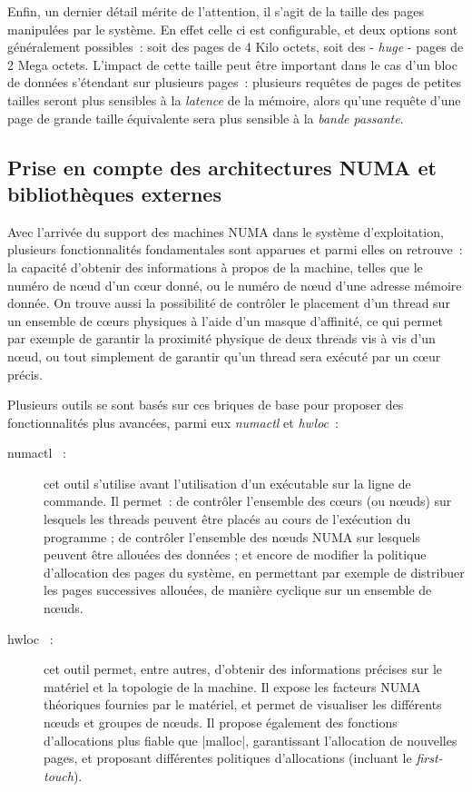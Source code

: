 Enfin, un dernier détail mérite de l'attention, il s'agit de la taille des pages manipulées par le système.
En effet celle ci est configurable, et deux options sont généralement possibles~: soit des pages de 4 Kilo octets, soit des - \emph{huge} - pages de 2 Mega octets.
L'impact de cette taille peut être important dans le cas d'un bloc de données s'étendant sur plusieurs pages~: plusieurs requêtes de pages de petites tailles seront plus sensibles à la \emph{latence} de la mémoire, alors qu'une requête d'une page de grande taille équivalente sera plus sensible à la \emph{bande passante}.

\subsection{Prise en compte des architectures NUMA et bibliothèques externes}\label{sec:context:os:lib}

Avec l'arrivée du support des machines NUMA dans le système d'exploitation, plusieurs fonctionnalités fondamentales sont apparues et parmi elles on retrouve~: la capacité d'obtenir des informations à propos de la machine, telles que le numéro de nœud d'un cœur donné, ou le numéro de nœud d'une adresse mémoire donnée.
On trouve aussi la possibilité de contrôler le placement d'un thread sur un ensemble de cœurs physiques à l'aide d'un masque d'affinité, ce qui permet par exemple de garantir la proximité physique de deux threads vis à vis d'un nœud, ou tout simplement de garantir qu'un thread sera exécuté par un cœur précis.

Plusieurs outils se sont basés sur ces briques de base pour proposer des fonctionnalités plus avancées, parmi eux \emph{numactl} et \emph{hwloc}~:

\begin{description}
  \item [numactl~\cite{numactl} :] cet outil s'utilise avant l'utilisation d'un exécutable sur la ligne de commande. Il permet~: de contrôler l'ensemble des cœurs (ou nœuds) sur lesquels les threads peuvent être placés au cours de l'exécution du programme ;
    de contrôler l'ensemble des nœuds NUMA sur lesquels peuvent être allouées des données ;
    et encore de modifier la politique d'allocation des pages du système, en permettant par exemple de distribuer les pages successives allouées, de manière cyclique sur un ensemble de nœuds.
  \item [hwloc~\cite{Broquedis2010} :] cet outil permet, entre autres, d'obtenir des informations précises sur le matériel et la topologie de la machine. Il expose les facteurs NUMA théoriques fournies par le matériel, et permet de visualiser les différents nœuds et groupes de nœuds.
  Il propose également des fonctions d'allocations plus fiable que |malloc|, garantissant l'allocation de nouvelles pages, et proposant différentes politiques d'allocations (incluant le \emph{first-touch}).
\end{description}


